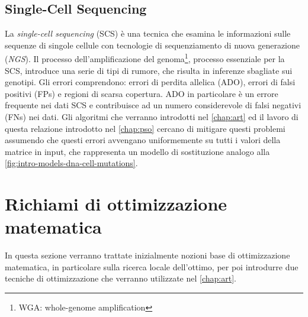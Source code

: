 \subsection{Single-Cell Sequencing}
\label{chap:intro-scs}
La \textit{single-cell sequencing} (SCS) è una tecnica che esamina le informazioni sulle sequenze di singole cellule con tecnologie di sequenziamento di nuova generazione (\textit{NGS}). Il processo dell'amplificazione del genoma\footnote{WGA: whole-genome amplification}, processo essenziale per la SCS, introduce una serie di tipi di rumore, che risulta in inferenze sbagliate sui genotipi. Gli errori comprendono: errori di perdita allelica (ADO), errori di falsi positivi (FPs) e regioni di scarsa copertura. ADO in particolare è un errore frequente nei dati SCS e contribuisce ad un numero considerevole di falsi negativi (FNs) nei dati. Gli algoritmi che verranno introdotti nel \autoref{chap:art} ed il lavoro di questa relazione introdotto nel \autoref{chap:pso} cercano di mitigare questi problemi assumendo che questi errori avvengano uniformemente su tutti i valori della matrice in input, che rappresenta un modello di sostituzione analogo alla \autoref{fig:intro-models-dna-cell-mutations}.

\section{Richiami di ottimizzazione matematica}
\label{chap:intro-optim}
In questa sezione verranno trattate inizialmente nozioni base di ottimizzazione matematica, in particolare sulla ricerca locale dell'ottimo, per poi introdurre due tecniche di ottimizzazione che verranno utilizzate nel \autoref{chap:art}.

